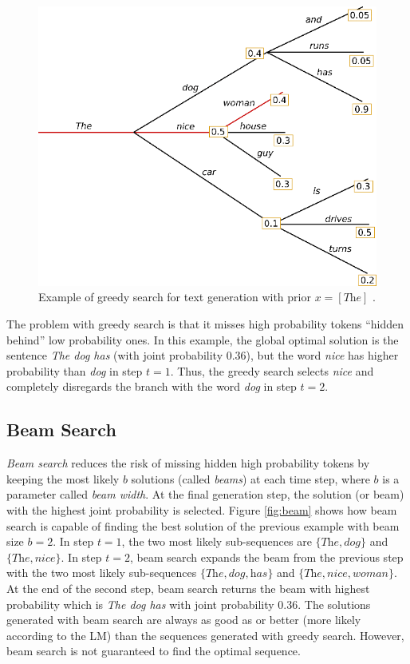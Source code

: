 \begin{figure}[!h]
 \centering
 \includegraphics[width=0.7\columnwidth]{imgs/background/greedy.png}
 \caption{Example of greedy search for text generation with prior $x = [\textit{The}]$ \cite{platen2020}.}
 \label{fig:greedy}
\end{figure}

The problem with greedy search is that it misses high probability tokens ``hidden behind'' low probability ones. In this example, the global optimal solution is the sentence \textit{The dog has} (with joint probability $0.36$), but the word \textit{nice} has higher probability than \textit{dog} in step $t=1$. Thus, the greedy search selects \textit{nice} and completely disregards the branch with the word \textit{dog} in step $t=2$.

\subsection{Beam Search}

\textit{Beam search} reduces the risk of missing hidden high probability tokens by keeping the most likely $b$ solutions (called \textit{beams}) at each time step, where $b$ is a parameter called \textit{beam width}. At the final generation step, the solution (or beam) with the highest joint probability is selected. Figure \ref{fig:beam} shows how beam search is capable of finding the best solution of the previous example with beam size $b=2$. In step $t=1$, the two most likely sub-sequences are $\{ \textit{The}, \textit{dog} \}$ and $\{ \textit{The}, \textit{nice} \}$. In step $t=2$, beam search expands the beam from the previous step with the two most likely sub-sequences $\{ \textit{The}, \textit{dog}, \textit{has} \}$ and $\{ \textit{The}, \textit{nice}, \textit{woman} \}$. At the end of the second step, beam search returns the beam with highest probability which is \textit{The dog has} with joint probability $0.36$. The solutions generated with beam search are always as good as or better (more likely according to the LM) than the sequences generated with greedy search. However, beam search is not guaranteed to find the optimal sequence.

